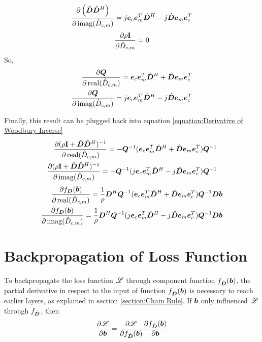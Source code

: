 \begin{appendices}
\begin{equation}
\begin{split}
\\
\frac{\partial \left(\hat{\bm{D}}\hat{\bm{D}}^H\right)}{\partial \operatorname{imag}(\hat{D}_{c,m})} = j\bm{e}_c\bm{e}_m^T\hat{\bm{D}}^H - j\hat{\bm{D}}\bm{e}_m\bm{e}_c^T
\end{split}
\end{equation}
\begin{equation}
\frac{\partial \rho{\bf I}}{\partial \hat{D}_{c,m}} = 0
\end{equation}
So,
\begin{equation}
\begin{split}
\frac{\partial \bm{Q}}{\partial 
\operatorname{real}(\hat{D}_{c,m})} = \bm{e}_c\bm{e}_m^T\hat{\bm{D}}^H + \hat{\bm{D}}\bm{e}_m\bm{e}_c^T
\\
\frac{\partial \bm{Q}}{\partial \operatorname{imag}(\hat{D}_{c,m})} = j\bm{e}_c\bm{e}_m^T\hat{\bm{D}}^H - j\hat{\bm{D}}\bm{e}_m\bm{e}_c^T
\end{split}
\end{equation}

Finally, this result can be plugged back into equation \ref{equation:Derivative of Woodbury Inverse}
\begin{equation}
\begin{split}
\frac{\partial (\rho{\bf I} + \hat{\bm{D}}\hat{\bm{D}}^H)^{-1}}{\partial 
\operatorname{real}(\hat{D}_{c,m})} = -\bm{Q}^{-1}(\bm{e}_c\bm{e}_m^T\hat{\bm{D}}^H + \hat{\bm{D}}\bm{e}_m\bm{e}_c^T)\bm{Q}^{-1}
\\
\frac{\partial (\rho{\bf I} + \hat{\bm{D}}\hat{\bm{D}}^H)^{-1}}{\partial \operatorname{imag}(\hat{D}_{c,m})} = -\bm{Q}^{-1}(j\bm{e}_c\bm{e}_m^T\hat{\bm{D}}^H - j\hat{\bm{D}}\bm{e}_m\bm{e}_c^T)\bm{Q}^{-1}
\end{split}
\end{equation}
\begin{equation} \label{equation:Woodbury Partial Dictionary Derivative}
\begin{split}
\frac{\partial f_{\bm{D}}(\bm{b})}{\partial 
\operatorname{real}(\hat{D}_{c,m})} = \frac{1}{\rho}\bm{D}^H\bm{Q}^{-1}(\bm{e}_c\bm{e}_m^T\hat{\bm{D}}^H + \hat{\bm{D}}\bm{e}_m\bm{e}_c^T)\bm{Q}^{-1}\bm{D}\bm{b}
\\
\frac{\partial f_{\bm{D}}(\bm{b})}{\partial \operatorname{imag}(\hat{D}_{c,m})} = \frac{1}{\rho}\bm{D}^H\bm{Q}^{-1}(j\bm{e}_c\bm{e}_m^T\hat{\bm{D}}^H - j\hat{\bm{D}}\bm{e}_m\bm{e}_c^T)\bm{Q}^{-1}\bm{D}\bm{b}
\end{split}
\end{equation}
\section{Backpropagation of Loss Function}
To backpropagate the loss function $\mathscr{L}$ through component function $f_{\hat{\bm{D}}}(\bm{b})$, the partial derivative in respect to the input of function $f_{\hat{\bm{D}}}(\bm{b})$ is necessary to reach earlier layers, as explained in section \ref{section:Chain Rule}. If $\bm{b}$ only influenced $\mathscr{L}$ through $f_{\hat{\bm{D}}}$, then
\begin{equation}
\frac{\partial \mathscr{L}}{\partial \bm{b}} = \frac{\partial \mathscr{L}}{\partial f_{\hat{\bm{D}}}(\bm{b})}\frac{\partial f_{\hat{\bm{D}}}(\bm{b})}{\partial \bm{b}}
\end{equation}


\end{appendices}

